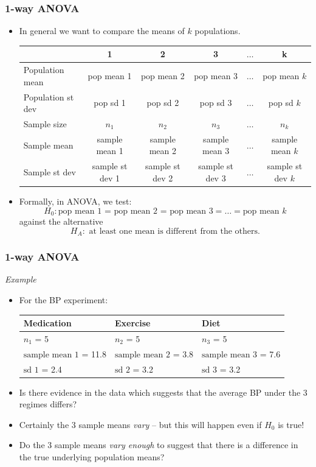 \documentclass[12pt,xcolor=dvipsnames,handout,mathserif,aspectratio=169]{beamer}
\begin{document}
\begin{frame}
\frametitle{1-way ANOVA}
\begin{itemize}
\item In general we want to compare the means of $k$ populations.
\begin{center}
{\scriptsize{
\begin{tabular}{lccccc} \hline
& 1& 2& 3& $\ldots$& k \\ \hline
Population mean& pop mean 1 & pop mean 2 & pop mean 3 & $\ldots$& pop mean $k$ \\
Population st dev& pop sd 1 &  pop sd 2 & pop sd 3 & $\ldots$& pop sd $k$ \\
Sample size& $n_1$& $n_2$& $n_3$&$\ldots$&  $n_k$ \\
Sample mean& sample mean 1& sample mean 2 & sample mean 3 &$\ldots$&  sample mean $k$\\
Sample st dev & sample st dev 1 & sample st dev 2 & sample st dev 3 & $\ldots$& sample st dev $k$  \\ \hline
\end{tabular}}}
\end{center}
\item Formally, in ANOVA, we test:
$$H_0: \mbox{pop mean 1 = pop mean 2 = pop mean 3} = \ldots =  \mbox{pop mean } k $$
against the alternative
$$H_A: \mbox{ at least one mean is different from the others.}$$
\end{itemize}
\end{frame}


\begin{frame}\frametitle{1-way ANOVA}
\emph{Example} 
\begin{itemize}
\item For the BP experiment:\\
\vspace*{0.5cm}
\begin{center}
{\small{
\begin{tabular}{lll} \hline
Medication & Exercise & Diet\\\hline
$n_1$ = 5 & $n_2$ = 5& $n_3$ = 5 \\
$\mbox{sample mean 1}$ = 11.8 &$\mbox{sample mean 2}$ = 3.8& $\mbox{sample mean 3}$ = 7.6\\
$\mbox{sd 1}$ = 2.4& $\mbox{sd 2}$ = 3.2& $\mbox{sd 3}$ = 3.2\\
\hline
\end{tabular}}}
\end{center}
\vspace*{0.3cm}
\item Is there evidence in the data which suggests that the average BP under the 3 regimes differs?
\vspace{0.3cm}
\item Certainly the 3 sample means \emph{vary} -- but this will happen even if $H_0$ is true! 
\vspace{0.3cm}
\item Do the 3 sample means \emph{vary enough} to suggest that there is a difference in the true underlying population means?
\end{itemize}
\end{frame}
\end{document}
